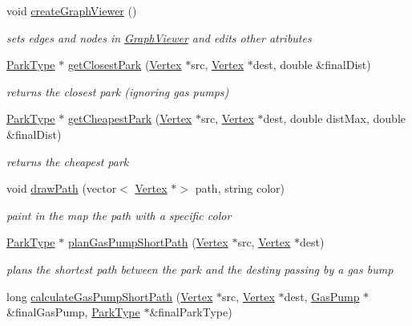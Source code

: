 \begin{DoxyCompactItemize}
\hypertarget{class_parking_a0d6680f145563bc6fe340b1577751e6f}{}\label{class_parking_a0d6680f145563bc6fe340b1577751e6f} 
void \hyperlink{class_parking_a0d6680f145563bc6fe340b1577751e6f}{create\+Graph\+Viewer} ()
\begin{DoxyCompactList}\small\item\em sets edges and nodes in \hyperlink{class_graph_viewer}{Graph\+Viewer} and edits other atributes \end{DoxyCompactList}\item 
\hyperlink{class_park_type}{Park\+Type} $\ast$ \hyperlink{class_parking_a977a7b98451cd93b099160e101b26013}{get\+Closest\+Park} (\hyperlink{class_vertex}{Vertex} $\ast$src, \hyperlink{class_vertex}{Vertex} $\ast$dest, double \&final\+Dist)
\begin{DoxyCompactList}\small\item\em returns the closest park (ignoring gas pumps) \end{DoxyCompactList}\item 
\hyperlink{class_park_type}{Park\+Type} $\ast$ \hyperlink{class_parking_a58ad3ea1d3adb08d3c1bcc39c468eb9c}{get\+Cheapest\+Park} (\hyperlink{class_vertex}{Vertex} $\ast$src, \hyperlink{class_vertex}{Vertex} $\ast$dest, double dist\+Max, double \&final\+Dist)
\begin{DoxyCompactList}\small\item\em returns the cheapest park \end{DoxyCompactList}\item 
void \hyperlink{class_parking_ad7f3892d2f758cb719596c86eebcd2ef}{draw\+Path} (vector$<$ \hyperlink{class_vertex}{Vertex} $\ast$$>$ path, string color)
\begin{DoxyCompactList}\small\item\em paint in the map the path with a specific color \end{DoxyCompactList}\item 
\hyperlink{class_park_type}{Park\+Type} $\ast$ \hyperlink{class_parking_abdb6ca65eb0ce593a4d61c1cc7127249}{plan\+Gas\+Pump\+Short\+Path} (\hyperlink{class_vertex}{Vertex} $\ast$src, \hyperlink{class_vertex}{Vertex} $\ast$dest)
\begin{DoxyCompactList}\small\item\em plans the shortest path between the park and the destiny passing by a gas bump \end{DoxyCompactList}\item 
long \hyperlink{class_parking_abccfb9b95538727e84bc5cc4f7af7f3c}{calculate\+Gas\+Pump\+Short\+Path} (\hyperlink{class_vertex}{Vertex} $\ast$src, \hyperlink{class_vertex}{Vertex} $\ast$dest, \hyperlink{class_gas_pump}{Gas\+Pump} $\ast$\&final\+Gas\+Pump, \hyperlink{class_park_type}{Park\+Type} $\ast$\&final\+Park\+Type)
$$
\end{DoxyCompactItemize}
